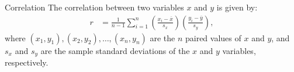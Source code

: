 \begin{onebox}{Correlation}%
		The correlation between two variables $x$ and $y$ is given by:
		\begin{align}
		r &=  \frac{1}{n-1}\sum^{n}_{i=1}
		\left(\frac{x_{i}-\overline{x}}
		{s_{x}}\right)\left(\frac{y_{i}-\overline{y}}{s_{y}}\right),
		\label{correlationEquation}
		\end{align}
		where $(x_1,y_1), (x_2,y_2), \ldots, (x_n, y_n)$ are the $n$ paired values of $x$ and $y$, and $s_x$ and $s_y$ are the sample standard deviations of the $x$ and $y$
		variables, respectively.
\end{onebox}

\textD{\newpage}

